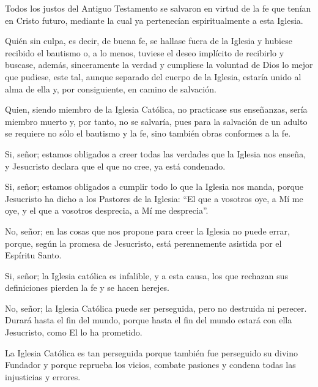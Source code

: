  Todos los justos del Antiguo
Testamento se salvaron en virtud de la fe que tenían en Cristo futuro, mediante la
cual ya pertenecían espiritualmente a esta Iglesia.

 Quién
sin culpa, es decir, de buena fe, se hallase fuera de la Iglesia y hubiese recibido el bautismo o, a lo menos, tuviese el deseo implícito de recibirlo y buscase, además, sinceramente la verdad y cumpliese la voluntad de Dios lo mejor que pudiese, este tal, aunque separado del cuerpo de la Iglesia, estaría unido al alma de ella y, por consiguiente, en camino de salvación.

 Quien, siendo miembro de la Iglesia Católica, no
practicase sus enseñanzas, sería miembro muerto y, por tanto, no se salvaría, pues
para la salvación de un adulto se requiere no sólo el bautismo y la fe, sino también
obras conformes a la fe.

 Si, señor; estamos obligados a creer todas las verdades que la Iglesia
nos enseña, y Jesucristo declara que el que no cree, ya está condenado.

 Si, señor; estamos obligados a cumplir todo lo que la Iglesia nos
manda, porque Jesucristo ha dicho a los Pastores de la Iglesia: “El que a vosotros
oye, a Mí me oye, y el que a vosotros desprecia, a Mí me desprecia”.

 No, señor;
en las cosas que nos propone para creer la Iglesia no puede errar, porque, según la
promesa de Jesucristo, está perennemente asistida por el Espíritu Santo.

 Si, señor; la Iglesia católica es
infalible, y a esta causa, los que rechazan sus definiciones pierden la fe y se hacen herejes.

 No, señor; la Iglesia
Católica puede ser perseguida, pero no destruida ni perecer. Durará hasta el fin
del mundo, porque hasta el fin del mundo estará con ella Jesucristo, como El lo
ha prometido.

 La Iglesia Católica es
tan perseguida porque también fue perseguido su divino Fundador y porque
reprueba los vicios, combate pasiones y condena todas las injusticias y errores.

